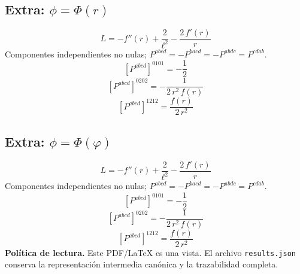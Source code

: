 \documentclass[11pt]{article}
\begin{document}
\subsection*{Extra: $\phi=\Phi\!\left(r\right)$}
\begin{dmath*}[breakdepth={5}]
L=-f''\!\left(r\right) + \frac{2}{{\ell}^{2}} - \frac{2\,f'\!\left(r\right)}{r}
\end{dmath*}
Componentes independientes no nulas; $P^{abcd}=-P^{bacd}=-P^{abdc}=P^{cdab}$.
\begin{dmath*}[breakdepth={5}]
\left[P^{abcd}\right]^{0101}=-\frac{1}{2}
\end{dmath*}
\begin{dmath*}[breakdepth={5}]
\left[P^{abcd}\right]^{0202}=-\frac{1}{2\,{r}^{2}\,f\!\left(r\right)}
\end{dmath*}
\begin{dmath*}[breakdepth={5}]
\left[P^{abcd}\right]^{1212}=\frac{f\!\left(r\right)}{2\,{r}^{2}}
\end{dmath*}
\subsection*{Extra: $\phi=\Phi\!\left(\varphi\right)$}
\begin{dmath*}[breakdepth={5}]
L=-f''\!\left(r\right) + \frac{2}{{\ell}^{2}} - \frac{2\,f'\!\left(r\right)}{r}
\end{dmath*}
Componentes independientes no nulas; $P^{abcd}=-P^{bacd}=-P^{abdc}=P^{cdab}$.
\begin{dmath*}[breakdepth={5}]
\left[P^{abcd}\right]^{0101}=-\frac{1}{2}
\end{dmath*}
\begin{dmath*}[breakdepth={5}]
\left[P^{abcd}\right]^{0202}=-\frac{1}{2\,{r}^{2}\,f\!\left(r\right)}
\end{dmath*}
\begin{dmath*}[breakdepth={5}]
\left[P^{abcd}\right]^{1212}=\frac{f\!\left(r\right)}{2\,{r}^{2}}
\end{dmath*}
\bigskip\noindent\textbf{Política de lectura.} Este PDF/LaTeX es una vista. El archivo \texttt{results.json} conserva la representación intermedia canónica y la trazabilidad completa.
\end{document}
